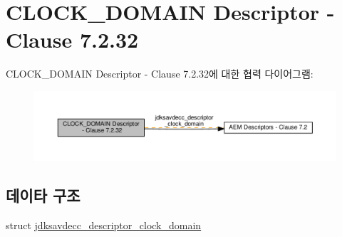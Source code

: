 \hypertarget{group__descriptor__clock__domain}{}\section{C\+L\+O\+C\+K\+\_\+\+D\+O\+M\+A\+IN Descriptor -\/ Clause 7.2.32}
\label{group__descriptor__clock__domain}
C\+L\+O\+C\+K\+\_\+\+D\+O\+M\+A\+IN Descriptor -\/ Clause 7.2.32에 대한 협력 다이어그램\+:
\nopagebreak
\begin{figure}[H]
\begin{center}
\leavevmode
\includegraphics[width=350pt]{group__descriptor__clock__domain}
\end{center}
\end{figure}
\subsection*{데이타 구조}
\begin{DoxyCompactItemize}
\item 
struct \hyperlink{structjdksavdecc__descriptor__clock__domain}{jdksavdecc\+\_\+descriptor\+\_\+clock\+\_\+domain}
\end{DoxyCompactItemize}
